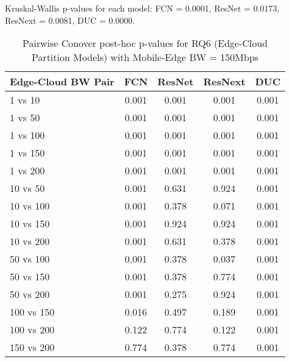 \begin{table}[h]
\centering
\caption{Pairwise Conover post-hoc p-values for RQ6 (Edge-Cloud Partition Models) with Mobile-Edge BW = 150Mbps}
\label{tab:conover_edge_cloud_partition_me150}
\smallskip
Kruskal-Wallis p-values for each model: FCN = 0.0001, ResNet = 0.0173, ResNext = 0.0081, DUC = 0.0000.

\begin{tabular}{lcccc}
\toprule
Edge-Cloud BW Pair & FCN & ResNet & ResNext & DUC \\
\midrule
1 vs 10 & 0.001 & 0.001 & 0.001 & 0.001 \\
1 vs 50 & 0.001 & 0.001 & 0.001 & 0.001 \\
1 vs 100 & 0.001 & 0.001 & 0.001 & 0.001 \\
1 vs 150 & 0.001 & 0.001 & 0.001 & 0.001 \\
1 vs 200 & 0.001 & 0.001 & 0.001 & 0.001 \\
10 vs 50 & 0.001 & 0.631 & 0.924 & 0.001 \\
10 vs 100 & 0.001 & 0.378 & 0.071 & 0.001 \\
10 vs 150 & 0.001 & 0.924 & 0.924 & 0.001 \\
10 vs 200 & 0.001 & 0.631 & 0.378 & 0.001 \\
50 vs 100 & 0.001 & 0.378 & 0.037 & 0.001 \\
50 vs 150 & 0.001 & 0.378 & 0.774 & 0.001 \\
50 vs 200 & 0.001 & 0.275 & 0.924 & 0.001 \\
100 vs 150 & 0.016 & 0.497 & 0.189 & 0.001 \\
100 vs 200 & 0.122 & 0.774 & 0.122 & 0.001 \\
150 vs 200 & 0.774 & 0.378 & 0.774 & 0.001 \\
\bottomrule
\end{tabular}
\end{table}

